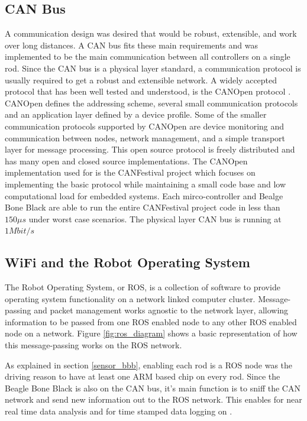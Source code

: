 \subsection{CAN Bus}
A communication design was desired that would be robust, extensible, and work over long distances.
A CAN bus fits these main requirements and was implemented to be the main communication between all controllers on a single rod.
Since the CAN bus is a physical layer standard, a communication protocol is usually required to get a robust and extensible network.
A widely accepted protocol that has been well tested and understood, is the CANOpen protocol \cite{boterenbrood2000canopen}.
CANOpen defines the addressing scheme, several small communication protocols and an application layer defined by a device profile.
Some of the smaller communication protocols supported by CANOpen are device monitoring and communication between nodes, network management, and a simple transport layer for message processing.
This open source protocol is freely distributed and has many open and closed source implementations.
The CANOpen implementation used for \SB{} is the CANFestival project which focuses on implementing the basic protocol while maintaining a small code base and low computational load for embedded systems.
Each mirco-controller and Bealge Bone Black are able to run the entire CANFestival project code in less than \(150 \mu s\) under worst case scenarios.
The physical layer CAN bus is running at \(1 Mbit/s\) 

\subsection{WiFi and the Robot Operating System}
The Robot Operating System, or ROS, is a collection of software to provide operating system functionality on a network linked computer cluster. 
Message-passing and packet management works agnostic to the network layer, allowing information to be passed from one ROS enabled node to any other ROS enabled node on a network.
Figure \ref{fig:ros_diagram} shows a basic representation of how this message-passing works on the \SB{} ROS network.

As explained in section \ref{sensor_bbb}, enabling each rod is a ROS node was the driving reason to have at least one ARM based chip on every rod.
Since the Beagle Bone Black is also on the CAN bus, it's main function is to sniff the CAN network and send new information out to the ROS network.
This enables for near real time data analysis and for time stamped data logging on \SB{}.

